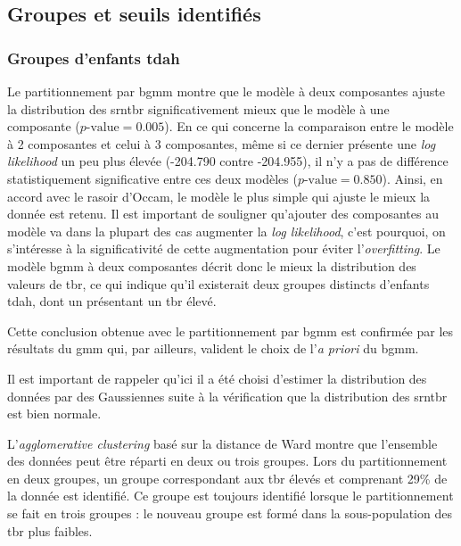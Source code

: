 \subsection{Groupes et seuils identifiés}

\subsubsection{Groupes d'enfants \gls{tdah}}

Le partitionnement par \gls{bgmm} montre que le modèle à deux composantes ajuste la distribution des \gls{srntbr} significativement mieux que le modèle
à une composante ($p\text{-value} = 0.005$). En ce qui concerne la comparaison entre le modèle à 2 composantes et celui à 3 composantes, même si ce dernier présente 
une \textit{log likelihood} un peu plus élevée (-204.790 contre -204.955), il n'y a pas de différence statistiquement significative entre ces deux modèles ($p\text{-value}
= 0.850$). Ainsi, en accord avec le rasoir d'Occam, le modèle le plus simple qui ajuste le mieux la donnée est retenu. Il est important de souligner
qu'ajouter des composantes au modèle va dans la plupart des cas augmenter la \textit{log likelihood}, c'est pourquoi, on s'intéresse à 
la significativité de cette augmentation pour éviter l'\textit{overfitting}. Le modèle \gls{bgmm} à deux composantes décrit donc le mieux la distribution
des valeurs de \gls{tbr}, ce qui indique qu'il existerait deux groupes distincts d'enfants \gls{tdah}, dont un présentant un \gls{tbr} élevé.

Cette conclusion obtenue avec le partitionnement par \gls{bgmm} est confirmée par les résultats du \gls{gmm} qui, par ailleurs, valident le choix de 
l'\textit{a priori} du \gls{bgmm}. 

Il est important de rappeler qu'ici il a été choisi d'estimer la distribution des données par des Gaussiennes suite à la vérification que la distribution des 
\gls{srntbr} est bien normale.

L'\textit{agglomerative clustering} basé sur la distance de Ward montre que l'ensemble des données peut être réparti 
en deux ou trois groupes. Lors du partitionnement en deux groupes, un groupe correspondant aux \gls{tbr} élevés et comprenant 29\% de la donnée
est identifié. Ce groupe est toujours identifié lorsque le partitionnement se fait en trois groupes : le nouveau groupe est formé dans la sous-population
des \gls{tbr} plus faibles. 

